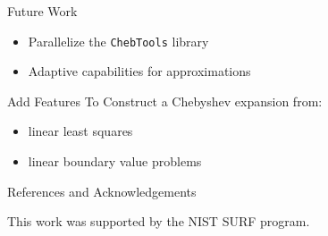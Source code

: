 \documentclass[final]{beamer}
\begin{document}
\begin{frame}{}
\begin{columns}[t]
\begin{column}{.31\linewidth}
\begin{block}{Future Work}
\begin{itemize}
\item Parallelize the {\tt ChebTools} library
\item Adaptive capabilities for approximations
\end{itemize}
Add Features To Construct a Chebyshev expansion from:
\begin{itemize}
\item linear least squares
\item linear boundary value problems
\end{itemize}
\end{block}

\begin{block}{References and Acknowledgements}

\scriptsize{}
\bigskip
{\normalsize This work was supported by the NIST SURF program.}
\end{block}
\end{column}
  \end{columns}
\end{frame}
\end{document}
